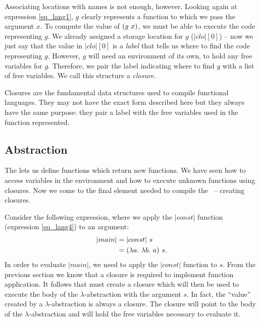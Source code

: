 \documentclass[12pt]{report}
\begin{document}
Associating locations with names is not enough, however. Looking again
at expression \ref{eq_lang1}, $g$ clearly represents a function to
which we pass the argument $x$. To compute the value of
$(g\ x)$, we must be able to execute the code representing
$g$. We already assigned a storage location for $g$ ($|clo|[0]$) -- now
we just say that the value in $|clo|[0]$ is a \emph{label} that tells
us where to find the code representing $g$. However, $g$ will need
an environment of its own, to hold any free variables for $g$. Therefore,
we pair the label indicating where to find $g$ with a list of free
variables. We call this structure a \emph{closure}.

Closures are the fundamental data structures used to compile
functional languages. They may not have the exact form described here
but they always have the same purpose: they pair a label with the free
variables used in the function represented. 

\subsection{Abstraction}
\label{subsec_lang3}
The \lamA lets us define functions which return new functions. We have
seen how to access variables in the environment and how to execute
unknown functions using closures. Now we come to the final element
needed to compile the \lamA\ -- creating closures.

Consider the following expression, where we apply the $|const|$ function (expression 
\ref{eq_lang4}) to an argument:
\begin{equation}
  \begin{split}
    |main| &= |const|\ s \\
         &= (\lambda a.\ \lambda b.\ a)\ s.
  \end{split}
\end{equation}
In order to evaluate $|main|$, we need to apply the $|const|$ function
to $s$. From the previous section we know that a closure is required to
implement function application. It follows that
 must create a closure which will
then be used to execute the body of the $\lambda$-abstraction with the
argument $s$. In fact, the ``value'' created by a
$\lambda$-abstraction is always a closure. The closure will point to
the body of the $\lambda$-abstraction and will hold the free variables
necessary to evaluate it.

\end{document}

